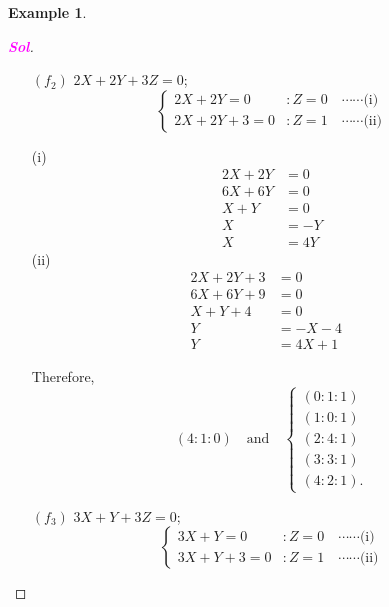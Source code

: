 \documentclass[12pt,openany]{book}
\theoremstyle{definition}
\newtheorem{example}{Example}[chapter]
\newcommand{\sol}{\textcolor{magenta}{\bf Sol}}
\begin{document}
\begin{example}
\begin{proof}[\sol]
\begin{enumerate}
\begin{multicols}{2}
\begin{align*}
					X-Y+3&=0\\
					Y&=X+3
					\end{align*}
				\end{multicols} Therefore, \[
				(1:1:0)\quad\text{and}\quad\begin{cases}
				(0:3:1)\\
				(1:4:1)\\
				(2:0:1)\\
				(3:1:1)\\
				(4:2:1).
				\end{cases}
				\]
				\item[$(f_2)$] $2X+2Y+3Z=0$; \[
				\begin{cases}
				2X+2Y=0 &: Z=0\quad\cdots\cdots\text{(i)}\\
				2X+2Y+3=0 &: Z=1\quad\cdots\cdots\text{(ii)}
				\end{cases}
				\] \begin{multicols}{2}
					(i)
					\begin{align*}
					2X+2Y&=0\\
					6X+6Y&=0\\
					X+Y&=0\\
					X&=-Y\\
					X&=4Y
					\end{align*}
					(ii)
					\begin{align*}
					2X+2Y+3&=0\\
					6X+6Y+9&=0\\
					X+Y+4&=0\\
					Y&=-X-4&\\
					Y&=4X+1
					\end{align*}
				\end{multicols} Therefore, \[
				(4:1:0)\quad\text{and}\quad\begin{cases}
				(0:1:1)\\
				(1:0:1)\\
				(2:4:1)\\
				(3:3:1)\\
				(4:2:1).
				\end{cases}
				\]
				\vspace{8pt}
				\item[$(f_3)$] $3X+Y+3Z=0$; \[
				\begin{cases}
				3X+Y=0 &: Z=0\quad\cdots\cdots\text{(i)}\\
				3X+Y+3=0 &: Z=1\quad\cdots\cdots\text{(ii)}
				\end{cases}
				\] \begin{multicols}{2}

\end{multicols}
\end{enumerate}
\end{proof}
\end{example}
\end{document}

